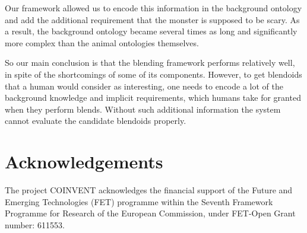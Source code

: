 \documentclass[letterpaper]{article}
\begin{document}
Our framework allowed us to encode this information in the background ontology and add the additional requirement that the monster is
supposed to be scary. As a result, the background ontology became several times  as long and significantly more complex  than the animal
ontologies themselves. 

So our main conclusion is  that the blending framework performs relatively well,
in spite of the shortcomings of some of its components. However, to get blendoids
that a human would consider as interesting, one needs to  encode a lot of the
background knowledge and implicit requirements, which humans take for granted when
they perform blends. Without such additional information the system cannot 
evaluate the candidate blendoids properly. 









\section*{Acknowledgements}

%
The project COINVENT acknowledges the financial support of the Future and Emerging Technologies (FET) programme within the Seventh Framework Programme for Research of the European Commission, under FET-Open Grant number: 611553.


%
 

\end{document}
